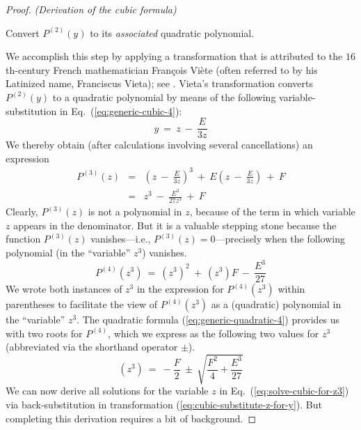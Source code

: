 \begin{proof} {\it (Derivation of the cubic formula)}
\medskip

 Convert $P^{(2)}(y)$ to its {\em associated} quadratic polynomial.


\noindent
We accomplish this step by applying a transformation that is attributed to the $16$th-century French mathematician Fran\c{c}ois Vi\`{e}te (often referred to by his Latinized name, Franciscus Vieta); see \cite{Hazewinkel}.  Vieta's transformation converts $P^{(2)}(y)$ to a quadratic polynomial by means of the following variable-substitution in Eq.~(\ref{eq:generic-cubic-4}):
\begin{equation}
\label{eq:cubic-substitute-z-for-y}
y \ = \ z \ - \ \frac{E}{3z}
\end{equation}
We thereby obtain (after calculations involving several cancellations) an expression
\begin{eqnarray}
\nonumber
P^{(3)}(z) & = & \left( z \ - \ \frac{E}{3z} \right)^3
\ + \ E \left(z \ - \ \frac{E}{3z} \right) \ + \ F \\
\label{eq:generic-cubic-5}
  & = &
z^3 \ - \ \frac{E^3}{27z^3}  \ + \ F
\end{eqnarray}
Clearly, $P^{(3)}(z)$ is not a polynomial in $z$, because of the term in which variable $z$ appears in the denominator.  But it is a valuable stepping stone because the function $P^{(3)}(z)$ vanishes---i.e., $P^{(3)}(z) = 0$---precisely when the following polynomial (in the ``variable'' $z^3$) vanishes.
\[ P^{(4)}(z^3) \ = \ (z^3)^2 \ + \ (z^3) F \ - \ \frac{E^3}{27} \]
We wrote both instances of $z^3$ in the expression for $P^{(4)}(z^3)$ within parentheses to facilitate the view of $P^{(4)}(z^3)$ as a (quadratic) polynomial in the ``variable'' $z^3$.  The quadratic formula (\ref{eq:generic-quadratic-4}) provides us with two roots for $P^{(4)}$, which we express as the following two values for $z^3$ (abbreviated via the shorthand operator $\pm$).   
\begin{equation}
\label{eq:solve-cubic-for-z3}
(z^3) \ = \
- \frac{F}{2} \ \pm \ \sqrt{\frac{F^2}{4} + \frac{E^3}{27}}
\end{equation}
We can now derive all solutions for the variable $z$ in Eq.~(\ref{eq:solve-cubic-for-z3}) via back-substitution in transformation (\ref{eq:cubic-substitute-z-for-y}).  But completing this derivation requires a bit of background.

\medskip

 


\end{proof}
